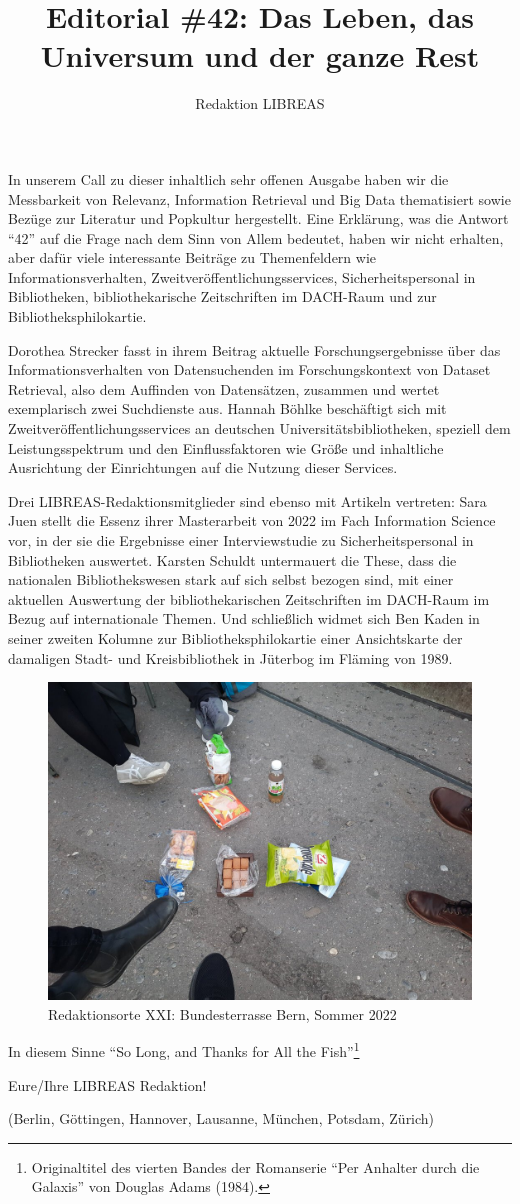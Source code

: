 \documentclass[a4paper,
fontsize=11pt,
oneside,
numbers=noperiodatend,
parskip=half-,
bibliography=totoc,
final
]{scrartcl}
\title{\LARGE{Editorial \#42: Das Leben, das Universum und der ganze Rest}}%
\author{Redaktion LIBREAS} %
\date{}
\begin{document}
\maketitle
\thispagestyle{fancyplain} 


In unserem Call zu dieser inhaltlich sehr offenen Ausgabe haben wir die
Messbarkeit von Relevanz, Information Retrieval und Big Data
thematisiert sowie Bezüge zur Literatur und Popkultur hergestellt. Eine
Erklärung, was die Antwort \enquote{42} auf die Frage nach dem Sinn von
Allem bedeutet, haben wir nicht erhalten, aber dafür viele interessante
Beiträge zu Themenfeldern wie Informationsverhalten,
Zweitveröffentlichungsservices, Sicherheitspersonal in Bibliotheken,
bibliothekarische Zeitschriften im DACH-Raum und zur
Bibliotheksphilokartie.

Dorothea Strecker fasst in ihrem Beitrag aktuelle Forschungsergebnisse
über das Informationsverhalten von Datensuchenden im Forschungskontext
von Dataset Retrieval, also dem Auffinden von Datensätzen, zusammen und
wertet exemplarisch zwei Suchdienste aus. Hannah Böhlke beschäftigt sich
mit Zweitveröffentlichungsservices an deutschen
Universitätsbibliotheken, speziell dem Leistungsspektrum und den
Einflussfaktoren wie Größe und inhaltliche Ausrichtung der Einrichtungen
auf die Nutzung dieser Services.

Drei LIBREAS-Redaktionsmitglieder sind ebenso mit Artikeln vertreten:
Sara Juen stellt die Essenz ihrer Masterarbeit von 2022 im Fach
Information Science vor, in der sie die Ergebnisse einer Interviewstudie
zu Sicherheitspersonal in Bibliotheken auswertet. Karsten Schuldt
untermauert die These, dass die nationalen Bibliothekswesen stark auf
sich selbst bezogen sind, mit einer aktuellen Auswertung der
bibliothekarischen Zeitschriften im DACH-Raum im Bezug auf
internationale Themen. Und schließlich widmet sich Ben Kaden in seiner
zweiten Kolumne zur Bibliotheksphilokartie einer Ansichtskarte der
damaligen Stadt- und Kreisbibliothek in Jüterbog im Fläming von 1989.

\begin{figure}[t!]
\centering
\includegraphics[width=.6\textwidth]{img/bern-snacks-feet.jpeg}
\caption{Redaktionsorte XXI: Bundesterrasse Bern, Sommer 2022}
\end{figure}

In diesem Sinne \enquote{So Long, and Thanks for All the
Fish}\footnote{Originaltitel des vierten Bandes der Romanserie
  \enquote{Per Anhalter durch die Galaxis} von Douglas Adams (1984).}

Eure/Ihre LIBREAS Redaktion!

(Berlin, Göttingen, Hannover, Lausanne, München, Potsdam, Zürich)

\end{document}
